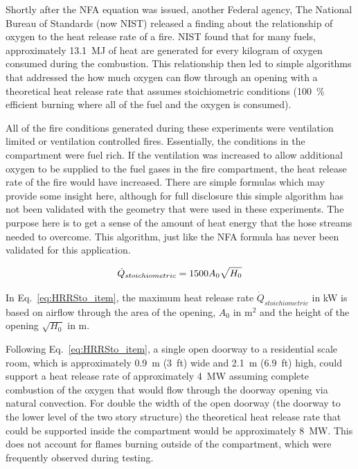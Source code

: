 \documentclass[12pt,oneside]{book}
\begin{document}
Shortly after the NFA equation was issued, another Federal agency, The National Bureau of Standards (now NIST) released a finding about the relationship of oxygen to the heat release rate of a fire. NIST found that for many fuels, approximately 13.1~MJ of heat are generated for every kilogram of oxygen consumed during the combustion. This relationship then led to simple algorithms that addressed the how much oxygen can flow through an opening with a theoretical heat release rate that assumes stoichiometric conditions (100~\% efficient burning where all of the fuel and the oxygen is consumed).

All of the fire conditions generated during these experiments were ventilation limited or ventilation controlled fires. Essentially, the conditions in the compartment were fuel rich. If the ventilation was increased to allow additional oxygen to be supplied to the fuel gases in the fire compartment, the heat release rate of the fire would have increased. There are simple formulas which may provide some insight here, although for full disclosure this simple algorithm has not been validated with the geometry that were used in these experiments. The purpose here is to get a sense of the amount of heat energy that the hose streams needed to overcome. This algorithm, just like the NFA formula has never been validated for this application.  

\begin{equation} \label{eq:HRRSto_item}
\dot{Q}_{stoichiometric} = 1500 A_0 \sqrt{H_0} \\
\end{equation}

In Eq.~\ref{eq:HRRSto_item}, the maximum heat release rate $\dot{Q}_{stoichiometric}$ in kW is based on airflow through the area of the opening, $A_0$ in m$^2$ and the height of the opening $\sqrt{H_0}$ in m.  

Following Eq.~\ref{eq:HRRSto_item}, a single open doorway to a residential scale room, which is approximately 0.9~m (3~ft) wide and 2.1~m (6.9~ft) high, could support a heat release rate of approximately 4~MW assuming complete combustion of the oxygen that would flow through the doorway opening via natural convection. For double the width of the open doorway (the doorway to the lower level of the two story structure) the theoretical heat release rate that could be supported inside the compartment would be approximately 8~MW. This does not account for flames burning outside of the compartment, which were frequently observed during testing.  
\end{document}

